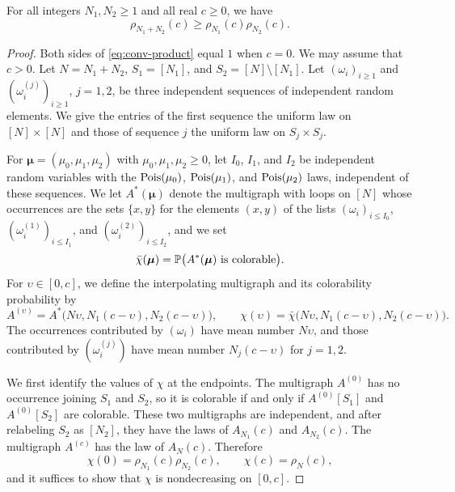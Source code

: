 \begin{lemma}\label{lem:conv-interp}
For all integers $N_1, N_2 \ge 1$ and all real $c \ge 0$, we have
\begin{equation}\label{eq:conv-product}
\rho_{N_1 + N_2}(c) \ge \rho_{N_1}(c) \rho_{N_2}(c).
\end{equation}
\end{lemma}

\begin{proof}
Both sides of \eqref{eq:conv-product} equal $1$ when $c = 0$. We may assume that $c > 0$. Let $N = N_1 + N_2$, $S_1 = [N_1]$, and $S_2 = [N] \setminus [N_1]$. Let $(\omega_i)_{i \ge 1}$ and $(\omega_i^{(j)})_{i \ge 1}$, $j = 1, 2$, be three independent sequences of independent random elements. We give the entries of the first sequence the uniform law on $[N] \times [N]$ and those of sequence $j$ the uniform law on $S_j \times S_j$.

For $\boldsymbol\mu = (\mu_0, \mu_1, \mu_2)$ with $\mu_0, \mu_1, \mu_2 \ge 0$, let $I_0$, $I_1$, and $I_2$ be independent random variables with the $\operatorname{Pois}(\mu_0)$, $\operatorname{Pois}(\mu_1)$, and $\operatorname{Pois}(\mu_2)$ laws, independent of these sequences. We let $A^*(\boldsymbol\mu)$ denote the multigraph with loops on $[N]$ whose occurrences are the sets $\{x, y\}$ for the elements $(x, y)$ of the lists $(\omega_i)_{i \le I_0}$, $(\omega^{(1)}_i)_{i \le I_1}$, and $(\omega^{(2)}_i)_{i \le I_2}$, and we set
\[
\bar\chi(\boldsymbol\mu) = \mathbb P\big(A^*(\boldsymbol\mu) \text{ is colorable}\big).
\]
For $\upsilon \in [0, c]$, we define the interpolating multigraph and its colorability probability by
\begin{equation}\label{eq:conv-interpolation}
A^{(\upsilon)} = A^*\big(N\upsilon, N_1 (c - \upsilon), N_2 (c - \upsilon)\big), \qquad \chi(\upsilon) = \bar\chi\big(N\upsilon, N_1 (c - \upsilon), N_2 (c - \upsilon)\big).
\end{equation}
The occurrences contributed by $(\omega_i)$ have mean number $N\upsilon$, and those contributed by $(\omega_i^{(j)})$ have mean number $N_j(c - \upsilon)$ for $j = 1, 2$.

We first identify the values of $\chi$ at the endpoints. The multigraph $A^{(0)}$ has no occurrence joining $S_1$ and $S_2$, so it is colorable if and only if $A^{(0)}[S_1]$ and $A^{(0)}[S_2]$ are colorable. These two multigraphs are independent, and after relabeling $S_2$ as $[N_2]$, they have the laws of $A_{N_1}(c)$ and $A_{N_2}(c)$. The multigraph $A^{(c)}$ has the law of $A_N(c)$. Therefore
\[
\chi(0) = \rho_{N_1}(c) \rho_{N_2}(c), \qquad \chi(c) = \rho_N(c),
\]
and it suffices to show that $\chi$ is nondecreasing on $[0, c]$.


\end{proof}
